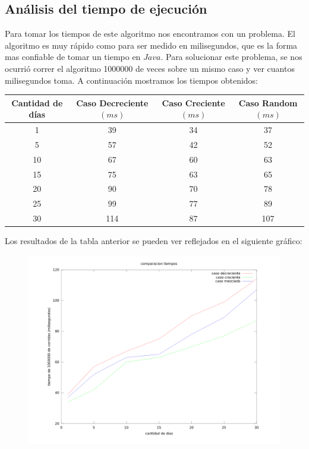 \subsection{Análisis del tiempo de ejecución}

\indent Para tomar los tiempos de este algoritmo nos encontramos con un problema. El algoritmo es muy rápido como para ser medido en milisegundos, que es la forma mas confiable de tomar un tiempo en $Java$. Para solucionar este problema, se nos ocurrió correr el algoritmo 1000000 de veces sobre un mismo caso y ver cuantos milisegundos toma. A continuación mostramos los tiempos obtenidos:\\

\begin{center}
\begin{tabular}{|c|c|c|c|}
  \hline
  Cantidad de días & Caso Decreciente $(ms)$   & Caso Creciente $(ms)$ & Caso Random $(ms)$ \\
  \hline
  1        & 39            & 34         & 37        \\
  \hline
  5        & 57            & 42         & 52        \\
  \hline
  10        & 67           & 60        & 63       \\
  \hline
  15        & 75            & 63        & 65        \\
  \hline
  20  	   & 90          & 70      & 78        \\
  \hline
  25        & 99            & 77        & 89        \\
  \hline
  30	   & 114          & 87      & 107        \\
  \hline
\end{tabular}
\end{center}

\indent Los resultados de la tabla anterior se pueden ver reflejados en el siguiente gráfico:

\begin{figure}[h]
\centering                                                       
        \includegraphics[width=340pt]{./figs/p1Tiempos.png}
\end{figure}


